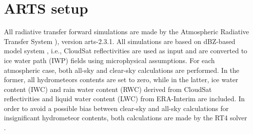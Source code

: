 \documentclass[amt, manuscript]{copernicus}
\begin{document}



\appendix
\section{ARTS setup}    %
\label{appendix:ARTS_setup}
%
All radiative transfer forward simulations are made by the Atmospheric Radiative
Transfer System \citep[ARTS,][]{eriksson:arts2:11,buehler:artst:18}), version
arts-2.3.1. All simulations are based on dBZ-based model system \citep{ekelund2020using}, i.e., CloudSat reflectivities are used as input and are converted to ice water path (IWP) fields using microphysical assumptions. For each atmospheric case, both all-sky and clear-sky calculations are performed. In the former, all hydrometeors contents are set to zero, while in the latter, ice water content (IWC) and rain water content (RWC) derived from CloudSat reflectivities and liquid water content (LWC) from ERA-Interim \citep{dee2011erainterim} are included. In order to avoid a possible bias between clear-sky and all-sky calculations for insignificant hydrometeor contents, both calculations are made by the RT4 solver \citep{evans1995microwavec}.
\end{document}
